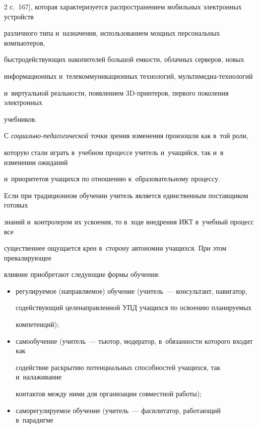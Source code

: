\begin{multicols}{2}
с.~167], которая характеризуется распространением мобильных электронных устройств\linebreak


различного типа и~назначения, использованием мощных персональных компьютеров,


быст\-ро\-действующих накопителей большой емкости, \mbox{облачных} серверов, новых


информационных и~телекоммуникационных технологий, муль\-ти\-ме\-диа-тех\-но\-ло\-гий


и~виртуальной реальности, появлением 3D-прин\-те\-ров, первого поколения электронных


учебников.





  С \textit{социально-педагогической} точки зрения изменения произошли как в~той роли,


которую стали играть в~учебном процессе учитель и~учащийся, так и~в изменении ожиданий


и~приоритетов учащихся по отношению к~образовательному процессу.





  Если при традиционном обучении учитель является единственным поставщиком готовых


знаний и~контролером их усвоения, то в~ходе внедрения ИКТ в~учебный процесс все


существеннее ощущается крен в~сторону автономии учащихся. При этом превалирующее


влияние приобретают следующие формы обучения:


  \begin{itemize}


\item регулируемое (направляемое) обучение (учи\-тель~--- кон\-суль\-тант, навигатор,


содействующий целенаправленной УПД учащихся по освоению планируемых


компетенций);


\item самообучение (учитель~--- тьютор, модератор, в~обязанности которого входит как


содействие раскрытию потенциальных способностей учащихся, так и~налаживание


контактов между ними для организации совместной работы);


\item саморегулируемое обучение (учитель~--- фасилитатор, работающий в~парадигме



\end{itemize}
\end{multicols}
